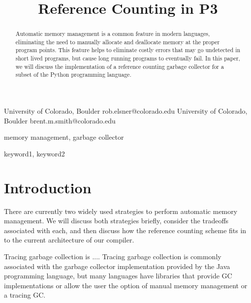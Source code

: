 \documentclass[preprint]{sigplanconf}
\begin{document}


\title{Reference Counting in P3}

           {University of Colorado, Boulder}
           {rob.elsner@colorado.edu}
           {University of Colorado, Boulder}
           {brent.m.smith@colorado.edu}

\maketitle

\begin{abstract}
Automatic memory management is a common feature in modern languages, eliminating the need to
manually allocate and deallocate memory at the proper program points.  This feature helps to
eliminate costly errors that may go undetected in short lived programs, but cause long running 
programs to eventually fail. 
In this paper, we will discuss the implementation of a reference counting
garbage collector for a subset of the Python programming language.
\end{abstract}


\terms
memory management, garbage collector

\keywords
keyword1, keyword2

\section{Introduction}

There are currently two widely used strategies to perform automatic memory management.  We will
discuss both strategies briefly, consider the tradeoffs associated with each, and then discuss
how the reference counting scheme fits in to the current architecture of our compiler.

Tracing garbage collection is ....
Tracing garbage collection is commonly associated with the garbage collector implementation  
provided by the Java programming language, but many languages have libraries that provide GC 
implementations 
or allow the user the option of manual memory management or a tracing GC.
\end{document}
